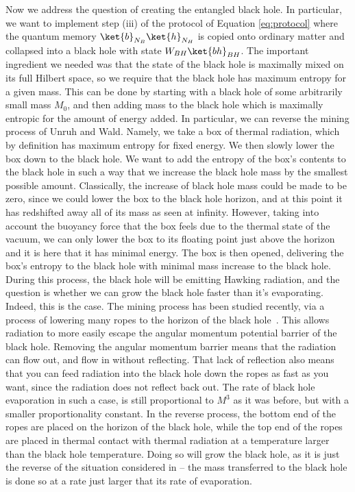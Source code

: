 \documentclass[12pt,a4paper]{article}
\begin{document}
Now we address the question of creating the entangled black hole. In particular, we want to implement step (iii) of the protocol of Equation \eqref{eq:protocol} where the quantum memory $\ket{b}_{N_{B}}\ket{h}_{N_{H}}$ is copied onto ordinary matter and collapsed into a black hole with state $W_{BH}\ket{bh}_{BH}$.
The important ingredient we needed was that the state of the black hole is maximally mixed on its full Hilbert space, so we require that the black hole has maximum entropy for a given mass. This can be done
by starting with a black hole of some arbitrarily small mass $M_0$, and then adding mass to the black hole which is maximally entropic for the amount of energy added. In particular, we can reverse the mining process 
 of Unruh and Wald\cite{unruh1982acceleration,unruh1983mine}. 
Namely, we take a box of thermal radiation, which by definition has maximum entropy for fixed energy.   We then slowly lower the box down to the black hole. We want to add the entropy of the box's contents to the black hole in such a way that we increase the black hole mass by the smallest possible amount. Classically, the increase of black hole mass could be made to be zero, since we could lower the box to the black hole horizon, and at this point it has redshifted away all of its mass as seen at infinity. However, taking into account the buoyancy force that the box feels due to the thermal state of the vacuum, we can only lower the box to its floating point just above the horizon and it is here that it has minimal energy. The box is then opened, delivering the box's entropy to the black hole with minimal mass increase to the black hole. 
During this process, the black hole will be emitting Hawking radiation, and the question is whether we can grow the black hole faster than it's evaporating. Indeed, this is the case.
The mining process has been studied recently, via a process of lowering many ropes to the horizon of the black hole~\cite{brown2012tensile}. This allows radiation to more easily escape the angular momentum potential barrier of the black hole. Removing the
angular momentum barrier means that the radiation can flow out, and flow in
without reflecting. That lack of reflection also means that you can feed  radiation into the
black hole down the ropes as fast as you want, since the radiation
does not reflect back out. The rate of black hole evaporation in such a case, is still proportional to $M^3$ as it was before, but with a smaller proportionality constant. In the reverse process, the bottom end of the ropes are placed on the horizon of the black hole, while the top end of the ropes are placed in thermal contact with thermal radiation at a temperature larger than the black hole temperature. Doing so will grow the black hole, as it is just the reverse of the situation considered in \cite{brown2012tensile} -- the mass transferred to the black hole is done so at a rate just larger that its rate of evaporation.
\end{document}
